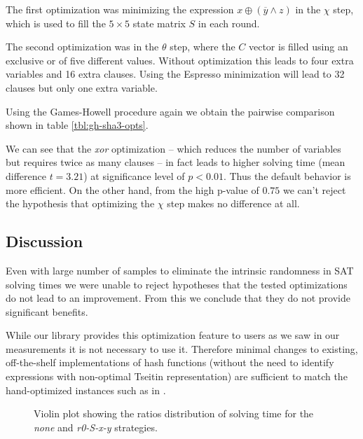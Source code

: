 The first optimization was minimizing the expression $x \oplus (\overline{y} \land z)$ in the $\chi$ step, which is used to fill the $5\times 5$ state matrix $S$ in each round.

The second optimization was in the $\theta$ step, where the $C$ vector is filled using an exclusive or of five different values.
Without optimization this leads to four extra variables and 16 extra clauses.
Using the Espresso minimization will lead to 32 clauses but only one extra variable.

Using the Games-Howell procedure again we obtain the pairwise comparison shown in table \ref{tbl:gh-sha3-opts}.

We can see that the \emph{xor} optimization -- which reduces the number of variables but requires twice as many clauses -- in fact leads to higher solving time (mean difference $t=3.21$) at significance level of $p < 0.01$.
Thus the default behavior is more efficient.
On the other hand, from the high p-value of $0.75$ we can't reject the hypothesis that optimizing the $\chi$ step makes no difference at all.

\subsection{Discussion}
Even with large number of samples to eliminate the intrinsic randomness in SAT solving times we were unable to reject hypotheses that the tested optimizations do not lead to an improvement.
From this we conclude that they do not provide significant benefits.

While our library provides this optimization feature to users as we saw in our measurements it is not necessary to use it.
Therefore minimal changes to existing, off-the-shelf implementations of hash functions (without the need to identify expressions with non-optimal Tseitin representation) are sufficient to match the hand-optimized instances such as in \cite{nossum2012sat}.

\begin{figure}
\caption{Violin plot showing the ratios distribution of solving time for the \emph{none} and \emph{r0-S-x-y} strategies.}
\label{fig:bo-ratio-time-none-r0sxy}
\end{figure}

